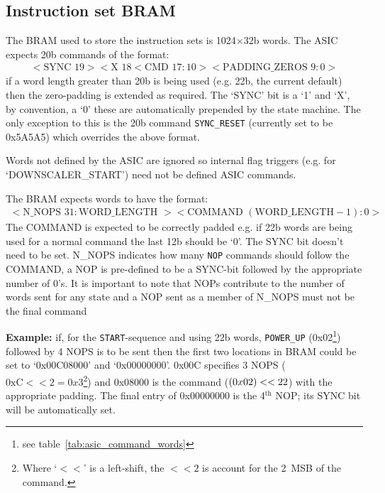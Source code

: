\documentclass[]{report}
\begin{document}
    \subsection{Instruction set BRAM} %
    \label{sub:tx_bram}
    The BRAM used to store the instruction sets is 1024\(\times\)32b words. The ASIC expects 20b commands of the format:
    \begin{align}\label{fmt:asic_format}
        <\text{SYNC }19><\text{X }18<\text{CMD } 17:10><\text{PADDING\_ZEROS } 9:0>
    \end{align}
    if a word length greater than 20b is being used (e.g. 22b, the current default) then the zero-padding is extended as required. The `SYNC' bit is a `1' and `X', by convention, a `0' these are automatically prepended by the state machine. The only exception to this is the 20b command \texttt{SYNC\_RESET} (currently set to be 0x5A5A5) which overrides the above format.

    Words not defined by the ASIC are ignored so internal flag triggers (e.g. for `DOWNSCALER\_START') need not be defined ASIC commands.

    The BRAM expects words to have the format:
    \begin{align}\label{fmt:tx_bram}
        <\text{N\_NOPS } 31:\text{WORD\_LENGTH }><\text{COMMAND } (\text{WORD\_LENGTH} - 1):0>
    \end{align}
    The COMMAND is expected to be correctly padded e.g. if 22b words are being used for a normal command the last 12b should be `0'. The SYNC bit doesn't need to be set. N\_NOPS indicates how many \texttt{NOP} commands should follow the COMMAND, a NOP is pre-defined to be a SYNC-bit followed by the appropriate number of 0's. It is important to note that NOPs contribute to the number of words sent for any state and a NOP sent as a member of N\_NOPS must not be the final command

    \textbf{Example:} if, for the \texttt{START}-sequence and using 22b words, \texttt{POWER\_UP} (0x02\footnote{see table~\ref{tab:asic_command_words}}) followed by 4 NOPS is to be sent then the first two locations in BRAM could be set to `0x00C08000' and `0x00000000'. 0x00C specifies 3 NOPS (\(\text{0xC}<<2 = 0x3\)\footnote{Where `\(<<\)' is a left-shift, the \( <<2 \) is account for the 2~MSB of the command.}) and 0x08000 is the command (\(\text(0x02) << 22 \)) with the appropriate padding. The final entry of 0x00000000 is the 4\(^{\text{th}}\) NOP; its SYNC bit will be automatically set.
\end{document}
